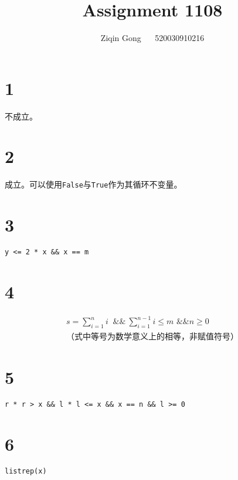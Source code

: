 \documentclass[12pt]{article}
\title{Assignment 1108}
\author{Ziqin Gong $\quad$ 520030910216}
\date{}
\begin{document}
  \maketitle

  \section*{1}

    不成立。

  \section*{2}

    成立。可以使用\texttt{False}与\texttt{True}作为其循环不变量。

  \section*{3}

    \begin{lstlisting}
y <= 2 * x && x == m
    \end{lstlisting}

  \section*{4}

    \begin{gather*}
      s = \sum_{i=1}^n i\  \text{ \&\& }\  \sum_{i=1}^{n-1} i \leq m \text{ \&\& } n \geq 0 \\ \text{（式中等号为数学意义上的相等，非赋值符号）}
    \end{gather*}

  \section*{5}

    \begin{lstlisting}
r * r > x && l * l <= x && x == n && l >= 0
    \end{lstlisting}

  \section*{6}

    \begin{lstlisting}
listrep(x)
    \end{lstlisting}
\end{document}

